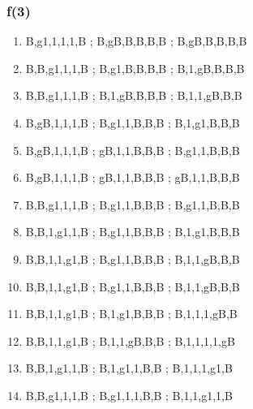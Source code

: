 \documentclass[leqno]{article}
\begin{document}
            \subsubsection{f(3)}
                \begin{enumerate}
                    \item {}            {B,g1,1,1,1,B ; B,gB,B,B,B,B ; B,gB,B,B,B,B}
                    \item {}            {B,B,g1,1,1,B ; B,g1,B,B,B,B ; B,1,gB,B,B,B}
                    \item {}          {B,B,g1,1,1,B ; B,1,gB,B,B,B ; B,1,1,gB,B,B}
                    \item {}          {B,gB,1,1,1,B ; B,g1,1,B,B,B ; B,1,g1,B,B,B}
                    \item {}         {B,gB,1,1,1,B ; gB,1,1,B,B,B ; B,g1,1,B,B,B}
                    \item {}        {B,gB,1,1,1,B ; gB,1,1,B,B,B ; gB,1,1,B,B,B}
                    \item {}           {B,B,g1,1,1,B ; B,g1,1,B,B,B ; B,g1,1,B,B,B}
                    \item {}           {B,B,1,g1,1,B ; B,g1,1,B,B,B ; B,1,g1,B,B,B}
                    \item {}          {B,B,1,1,g1,B ; B,g1,1,B,B,B ; B,1,1,gB,B,B}
                    \item {}          {B,B,1,1,g1,B ; B,g1,1,B,B,B ; B,1,1,gB,B,B}
                    \item {}      {B,B,1,1,g1,B ; B,1,g1,B,B,B ; B,1,1,1,gB,B}
                    \item {}    {B,B,1,1,g1,B ; B,1,1,gB,B,B ; B,1,1,1,1,gB}
                    \item {}     {B,B,1,g1,1,B ; B,1,g1,1,B,B ; B,1,1,1,g1,B}
                    \item {}     {B,B,g1,1,1,B ; B,g1,1,1,B,B ; B,1,1,g1,1,B}

\end{enumerate}
\end{document}
